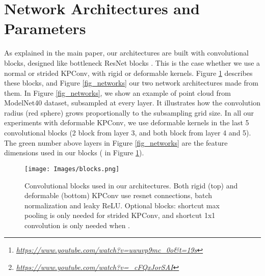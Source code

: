 \documentclass[10pt,twocolumn,letterpaper]{article}
\begin{document}
\begin{abstract}
\noindent
This supplementary document is organized as follows:
\begin{itemize}
    \itemsep 0ex 
    \item Sec.\,\ref{sec:A} details our network architectures, the training parameters, and compares the model sizes and speeds.
    \item Sec.\,\ref{sec:B} presents the kernel point initialization method.
    \item Sec.\,\ref{sec:C} describes how our regularization strategy tackles the ``lost" kernel point phenomenon.
    \item Sec.\,\ref{sec:D} enumerates more segmentation results with class scores.
    \item \textbf{KPConv Method} video\footnote{\textit{\url{https://www.youtube.com/watch?v=uwuvp9mc_0o&t=19s}}} illustrates KPConv principle with animated diagrams, and shows some learned kernel deformations.
    \item \textbf{KPConv Results} video\footnote{\textit{\url{https://www.youtube.com/watch?v=_cFQxJorSAI}}}  shows indoor and outdoor scenes segmented by KP-FCNN.
\end{itemize}
\end{abstract}

\section{Network Architectures and Parameters}
\label{sec:A}

As explained in the main paper, our architectures are built with convolutional blocks, designed like bottleneck ResNet blocks \cite{he2016deep}. This is the case whether we use a normal or strided KPConv, with rigid or deformable kernels. Figure \ref{fig_blocks} describes these blocks, and Figure \ref{fig_networks} our two network architectures made from them. In Figure \ref{fig_networks}, we show an example of point cloud from ModelNet40 dataset, subsampled at every layer. It illustrates how the convolution radius (red sphere) grows proportionally to the subsampling grid size. In all our experiments with deformable KPConv, we use deformable kernels in the last 5 convolutional blocks (2 block from layer 3, and both block from layer 4 and 5). The green number above layers in Figure \ref{fig_networks} are the feature dimensions used in our blocks ( in Figure \ref{fig_blocks}).

\begin{figure}[b]
    \centering
    \texttt{[image: Images/blocks.png]}
    \caption{Convolutional blocks used in our architectures. Both rigid (top) and deformable (bottom) KPConv use resnet connections, batch normalization and leaky ReLU. Optional blocks: shortcut max pooling is only needed for strided KPConv, and shortcut 1x1 convolution is only needed when .}
    \label{fig_blocks}
\end{figure}
\end{document}
